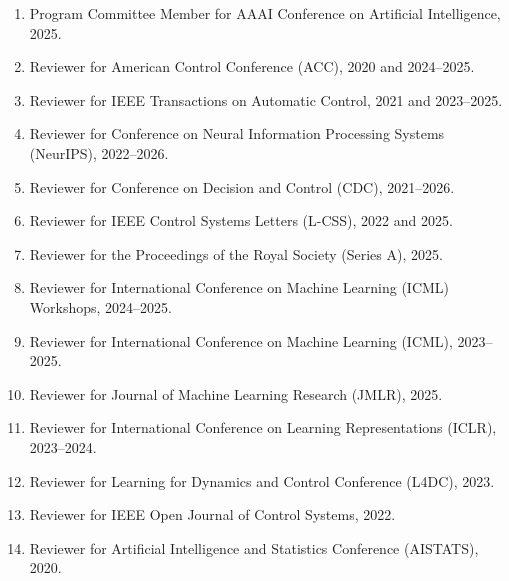 \begin{enumerate}[label={\arabic*.}]
	\item Program Committee Member for AAAI Conference on Artificial Intelligence, 2025.
	\item Reviewer for American Control Conference (ACC), 2020 and 2024--2025.
	\item Reviewer for IEEE Transactions on Automatic Control, 2021 and 2023--2025.
	\item Reviewer for Conference on Neural Information Processing Systems (NeurIPS), 2022--2026.
	\item Reviewer for Conference on Decision and Control (CDC), 2021--2026.
	\item Reviewer for IEEE Control Systems Letters (L-CSS), 2022 and 2025.
	\item Reviewer for the Proceedings of the Royal Society (Series A), 2025.
	\item Reviewer for International Conference on Machine Learning (ICML) Workshops, 2024--2025.
	\item Reviewer for International Conference on Machine Learning (ICML), 2023--2025.
	\item Reviewer for Journal of Machine Learning Research (JMLR), 2025.
	\item Reviewer for International Conference on Learning Representations (ICLR), 2023--2024.
	\item Reviewer for Learning for Dynamics and Control Conference (L4DC), 2023.
	\item Reviewer for IEEE Open Journal of Control Systems, 2022.
	\item Reviewer for Artificial Intelligence and Statistics Conference (AISTATS), 2020.
\end{enumerate}
